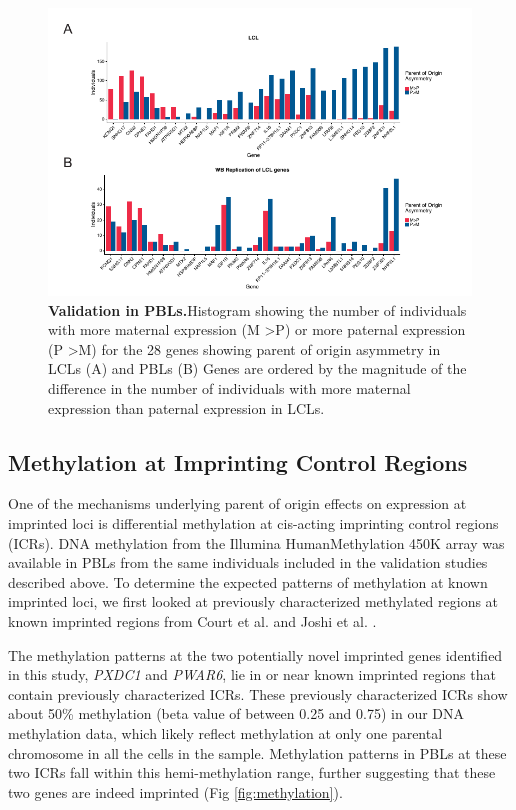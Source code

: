 \begin{figure}[!htb]
\centering \includegraphics[width=6in]{img/ch03/fig-02.pdf}
\caption[Validation in PBLs.]{\textbf{Validation in PBLs.}Histogram showing the number of individuals with more maternal expression (M \textgreater P) or more paternal expression (P \textgreater M) for the 28 genes showing parent of origin asymmetry in LCLs (A) and PBLs (B) Genes are ordered by the magnitude of the difference in the number of individuals with more maternal expression than paternal expression in LCLs. }
\label{fig:matpatPBLs}
\end{figure}


\subsection{Methylation at Imprinting Control Regions}\label{Methylation at Imprinting Control Regions}
One of the mechanisms underlying parent of origin effects on expression at imprinted loci is differential methylation at cis-acting imprinting control regions (ICRs). DNA methylation from the Illumina HumanMethylation 450K array was available in PBLs from the same individuals included in the validation studies described above. To determine the expected patterns of methylation at known imprinted loci, we first looked at previously characterized methylated regions at known imprinted regions from Court et al. and Joshi et al. \cite{Court:2014kc,Joshi:2016bb}.

The methylation patterns at the two potentially novel imprinted genes identified in this study, \emph{PXDC1} and \emph{PWAR6}, lie in or near known imprinted regions that contain previously characterized ICRs. These previously characterized ICRs show about 50\% methylation (beta value of between 0.25 and 0.75) in our DNA methylation data, which likely reflect methylation at only one parental chromosome in all the cells in the sample. Methylation patterns in PBLs at these two ICRs fall within this hemi-methylation range, further suggesting that these two genes are indeed imprinted (Fig \ref{fig:methylation}).


